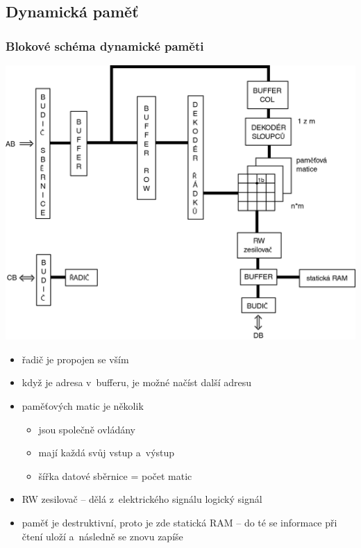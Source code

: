 \documentclass[a4paper,12pt]{article}
\providecommand{\tightlist}{%
\setlength{\itemsep}{0pt}\setlength{\parskip}{0pt}}
\begin{document}
\subsection{Dynamická paměť}

\subsubsection{Blokové schéma dynamické paměti}

\includegraphics[width=17cm]{ref/blokove-schema-dynamicke-pameti.png}

\begin{itemize}
\tightlist
\item řadič je propojen se vším
\item když je adresa v~bufferu, je možné načíst další adresu
\item paměťových matic je několik

  \begin{itemize}
  \tightlist
  \item jsou společně ovládány
  \item mají každá svůj vstup a~výstup
  \item šířka datové sběrnice = počet matic
  \end{itemize}
\item RW zesilovač -- dělá z~elektrického signálu logický signál
\item paměť je destruktivní, proto je zde statická RAM -- do té se informace
  při čtení uloží a~následně se znovu zapíše
\end{itemize}
\end{document}
